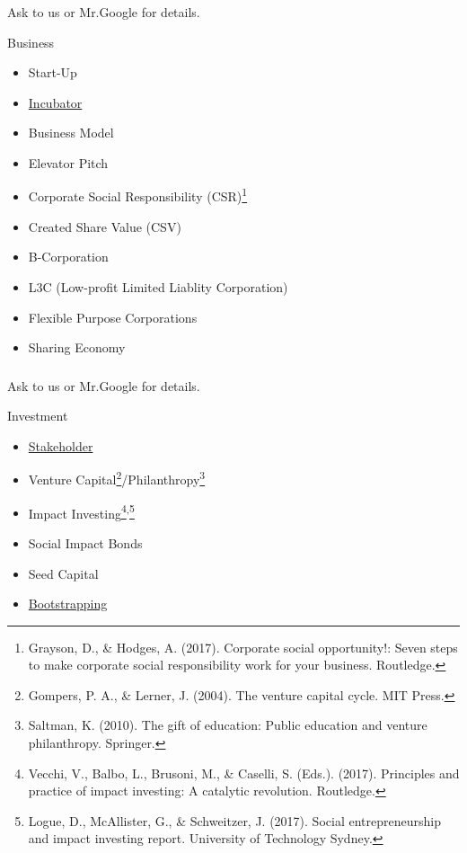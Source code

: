 \documentclass[dvipdfmx,10pt]{beamer}
\newcommand{\ft}{\frametitle}
\begin{document}
\begin{frame}\ft{\insertsection}
Ask to us or Mr.Google for details.
\begin{exampleblock}{Business}
\begin{itemize}
    \item Start-Up
    \item \href{https://en.wikipedia.org/wiki/Incubator}{Incubator}
    \item Business Model
    \item Elevator Pitch
    \item Corporate Social Responsibility (CSR)\footnote{Grayson, D., \& Hodges, A. (2017). Corporate social opportunity!: Seven steps to make corporate social responsibility work for your business. Routledge.}
    \item Created Share Value (CSV)
    \item B-Corporation
    \item L3C (Low-profit Limited Liablity Corporation)
    \item Flexible Purpose Corporations
    \item Sharing Economy
\end{itemize}
\end{exampleblock}
\end{frame}
\begin{frame}\ft{\insertsection}
Ask to us or Mr.Google for details.
\begin{exampleblock}{Investment}
\begin{itemize}
\item \href{https://en.wikipedia.org/wiki/Stakeholder}{Stakeholder}
\item Venture Capital\footnote{Gompers, P. A., \& Lerner, J. (2004). The venture capital cycle. MIT Press.}/Philanthropy\footnote{Saltman, K. (2010). The gift of education: Public education and venture philanthropy. Springer.}
\item Impact Investing\footnote{Vecchi, V., Balbo, L., Brusoni, M., \& Caselli, S. (Eds.). (2017). Principles and practice of impact investing: A catalytic revolution. Routledge.}\textsuperscript{,}\footnote{Logue, D., McAllister, G., \& Schweitzer, J. (2017). Social entrepreneurship and impact investing report. University of Technology Sydney.}
\item Social Impact Bonds
\item Seed Capital
\item \href{https://en.wikipedia.org/wiki/Bootstrapping}{Bootstrapping}
\end{itemize}
\end{exampleblock}
\end{frame}
\end{document}
